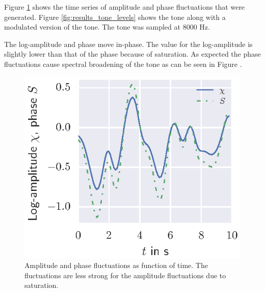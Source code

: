 Figure \ref{fig:results_tone_logamp_and_phase} shows the time series of
amplitude and phase fluctuations that were generated. Figure
\ref{fig:results_tone_levels} shows the tone along with a modulated version of
the tone. The tone was sampled at 8000 Hz.

The log-amplitude and phase move in-phase. The value for the log-amplitude is slightly lower than that of the phase because of saturation.
As expected the phase fluctuations cause spectral broadening of the tone as can be seen in Figure \cite{Ostashev2016}.

\begin{figure}[H]
  \centering
  \includegraphics[]{../figures/manual/turbulence-model/logamp_and_phase}
  \caption{Amplitude and phase fluctuations as function of time. The fluctuations are less strong for the amplitude fluctuations due to saturation.}
  \label{fig:results_tone_logamp_and_phase}
\end{figure}

